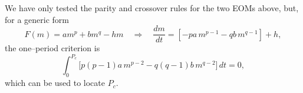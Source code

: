 \documentclass{article}
\begin{document}
We have only tested the parity and crossover rules for the two EOMs above, but, for a generic form\begin{equation}
  F(m)=a m^p + b m^q - h m \quad\Rightarrow\quad \frac{dm}{dt} = [-pa\,m^{p-1} - qb\,m^{q-1}] + h ,
\end{equation}
the one–period criterion is
\begin{equation}
  \int_0^{P_c} \!\bigl[p(p-1)a\,m^{p-2} - q(q-1)b\,m^{q-2}\bigr]\,dt = 0,
  \label{eq:Pc_m4m6}
\end{equation}
which can be used to locate $P_c$. 


\end{document}
